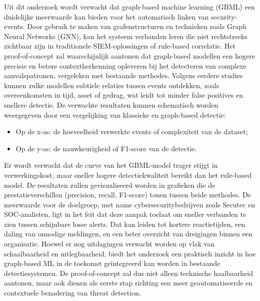 Uit dit onderzoek wordt verwacht dat graph-based machine learning (GBML) een duidelijke meerwaarde kan bieden voor het automatisch linken van security-events.  
Door gebruik te maken van grafenstructuren en technieken zoals Graph Neural Networks (GNN), kan het systeem verbanden leren die niet rechtstreeks zichtbaar zijn in traditionele SIEM-oplossingen of rule-based correlatie.  
\newline
\newline
Het proof-of-concept zal waarschijnlijk aantonen dat graph-based modellen een hogere precisie en betere contextherkenning opleveren bij het detecteren van complexe aanvalspatronen, vergeleken met bestaande methodes.  
Volgens eerdere studies \autocite{Vitulyova2025, Gamage2025} kunnen zulke modellen subtiele relaties tussen events ontdekken, zoals overeenkomsten in tijd, asset of gedrag, wat leidt tot minder false positives en snellere detectie.
\newline
\newline
De verwachte resultaten kunnen schematisch worden weergegeven door een vergelijking van klassieke en graph-based detectie:
\begin{itemize}
    \item Op de x-as: de hoeveelheid verwerkte events of complexiteit van de dataset;
    \item Op de y-as: de nauwkeurigheid of F1-score van de detectie.
\end{itemize}
Er wordt verwacht dat de curve van het GBML-model trager stijgt in verwerkingskost, maar sneller hogere detectiekwaliteit bereikt dan het rule-based model.  
De resultaten zullen gevisualiseerd worden in grafieken die de prestatieverschillen (precision, recall, F1-score) tonen tussen beide methodes.
\newline
\newline
De meerwaarde voor de doelgroep, met name cybersecuritybedrijven zoals Secutec en SOC-\newline analisten, ligt in het feit dat deze aanpak toelaat om sneller verbanden te zien tussen schijnbare losse alerts.  
Dat kan leiden tot kortere reactietijden, een daling van onnodige meldingen, en een beter overzicht van dreigingen binnen een organisatie.  
\newline
\newline
Hoewel er nog uitdagingen verwacht worden op vlak van schaalbaarheid en uitlegbaarheid, biedt het onderzoek een praktisch inzicht in hoe graph-based ML in de toekomst geïntegreerd kan worden in bestaande detectiesystemen.  
De proof-of-concept zal dus niet alleen technische haalbaarheid aantonen, maar ook dienen als eerste stap richting een meer geautomatiseerde en contextuele benadering van threat detection.


